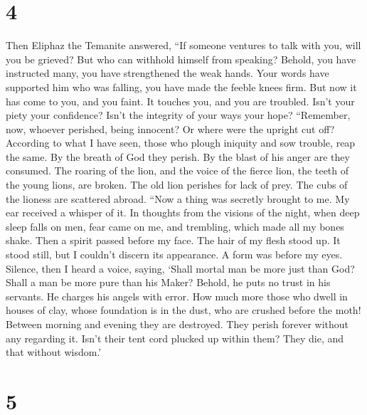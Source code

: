 \hypertarget{section-3}{%
\section{4}\label{section-3}}

 Then Eliphaz the Temanite answered,  ``If
someone ventures to talk with you, will you be grieved? But who can
withhold himself from speaking?  Behold, you have
instructed many, you have strengthened the weak hands. 
Your words have supported him who was falling, you have made the feeble
knees firm.  But now it has come to you, and you faint. It
touches you, and you are troubled.  Isn't your piety your
confidence? Isn't the integrity of your ways your hope? 
``Remember, now, whoever perished, being innocent? Or where were the
upright cut off?  According to what I have seen, those who
plough iniquity and sow trouble, reap the same.  By the
breath of God they perish. By the blast of his anger are they consumed.
 The roaring of the lion, and the voice of the fierce
lion, the teeth of the young lions, are broken.  The old
lion perishes for lack of prey. The cubs of the lioness are scattered
abroad.  ``Now a thing was secretly brought to me. My ear
received a whisper of it.  In thoughts from the visions
of the night, when deep sleep falls on men,  fear came on
me, and trembling, which made all my bones shake.  Then a
spirit passed before my face. The hair of my flesh stood up.
 It stood still, but I couldn't discern its appearance. A
form was before my eyes. Silence, then I heard a voice, saying,
 `Shall mortal man be more just than God? Shall a man be
more pure than his Maker?  Behold, he puts no trust in
his servants. He charges his angels with error.  How much
more those who dwell in houses of clay, whose foundation is in the dust,
who are crushed before the moth!  Between morning and
evening they are destroyed. They perish forever without any regarding
it.  Isn't their tent cord plucked up within them? They
die, and that without wisdom.'

\hypertarget{section-4}{%
\section{5}\label{section-4}}

